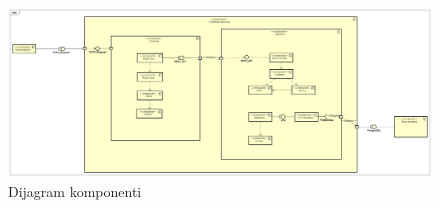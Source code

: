 \begin{figure} [H]
	\centering
	\includegraphics[width=1\linewidth]{dijagrami/DijagramKomponenti.png}
	\caption{Dijagram komponenti}
	\label{fig:Dijagram komponenti}
\end{figure}